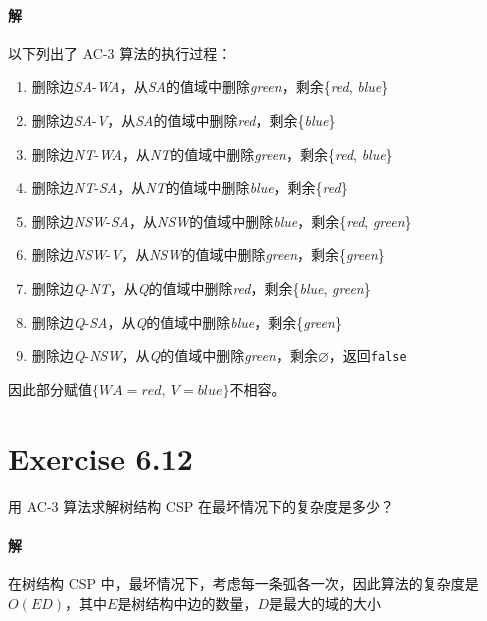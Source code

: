 \documentclass{article}
\begin{document}
\paragraph{解}
以下列出了 AC-3 算法的执行过程：
\begin{enumerate}[i]
    \item 删除边\textit{SA}-\textit{WA}，从\textit{SA}的值域中删除\textit{green}，剩余\{\textit{red}, \textit{blue}\}
    \item 删除边\textit{SA}-\textit{V}，从\textit{SA}的值域中删除\textit{red}，剩余\{\textit{blue}\}
    \item 删除边\textit{NT}-\textit{WA}，从\textit{NT}的值域中删除\textit{green}，剩余\{\textit{red}, \textit{blue}\}
    \item 删除边\textit{NT}-\textit{SA}，从\textit{NT}的值域中删除\textit{blue}，剩余\{\textit{red}\}
    \item 删除边\textit{NSW}-\textit{SA}，从\textit{NSW}的值域中删除\textit{blue}，剩余\{\textit{red}, \textit{green}\}
    \item 删除边\textit{NSW}-\textit{V}，从\textit{NSW}的值域中删除\textit{green}，剩余\{\textit{green}\}
    \item 删除边\textit{Q}-\textit{NT}，从\textit{Q}的值域中删除\textit{red}，剩余\{\textit{blue}, \textit{green}\}
    \item 删除边\textit{Q}-\textit{SA}，从\textit{Q}的值域中删除\textit{blue}，剩余\{\textit{green}\}
    \item 删除边\textit{Q}-\textit{NSW}，从\textit{Q}的值域中删除\textit{green}，剩余$\varnothing$，返回\texttt{false}
\end{enumerate}
因此部分赋值$\{WA = red,\ V = blue\}$不相容。

\section{Exercise 6.12}
用 AC-3 算法求解树结构 CSP 在最坏情况下的复杂度是多少？

\paragraph{解}
在树结构 CSP 中，最坏情况下，考虑每一条弧各一次，因此算法的复杂度是$O(ED)$，其中$E$是树结构中边的数量，$D$是最大的域的大小
\end{document}
